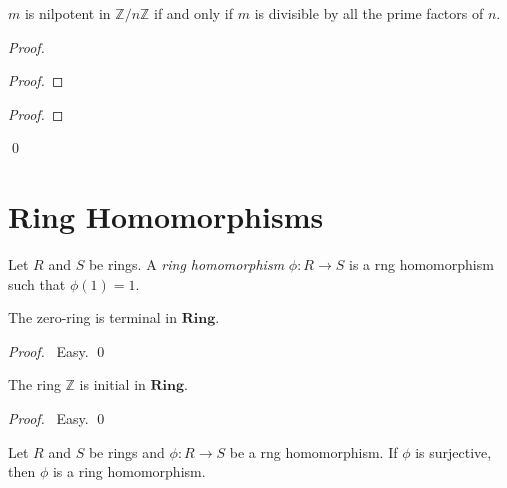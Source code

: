 \begin{prop}
$m$ is nilpotent in $\mathbb{Z} / n \mathbb{Z}$ if and only if $m$ is divisible by all the prime factors of $n$.
\end{prop}

\begin{proof}
\pf
{}
\begin{proof}
\end{proof}
\begin{proof}
\end{proof}
\qed
\end{proof}

\chapter{Ring Homomorphisms}

\begin{df}
Let $R$ and $S$ be rings. A \emph{ring homomorphism} $\phi : R \rightarrow S$ is a rng homomorphism such that $\phi(1) = 1$.
\end{df}

\begin{prop}
The zero-ring is terminal in $\mathbf{Ring}$.
\end{prop}

\begin{proof}
\pf\ Easy. \qed
\end{proof}

\begin{prop}
The ring $\mathbb{Z}$ is initial in $\mathbf{Ring}$.
\end{prop}

\begin{proof}
\pf\ Easy. \qed
\end{proof}

\begin{prop}
Let $R$ and $S$ be rings and $\phi : R \rightarrow S$ be a rng homomorphism. If $\phi$ is surjective, then $\phi$ is a ring homomorphism.
\end{prop}

